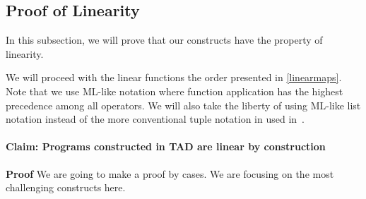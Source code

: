 \subsection{Proof of Linearity}
In this subsection, we will prove that our constructs have the property of linearity.

We will proceed with the linear functions the order presented in
\autoref{linearmaps}.  Note that we use ML-like notation where function application
has the highest precedence among all operators.  We will also take the liberty
of using ML-like list notation instead of the more conventional tuple notation
in used in~\cite{ladr}.

\paragraph{Claim:  Programs constructed in TAD are linear by construction}

\textbf{Proof}
We are going to make a proof by cases.  We are focusing on the most challenging
constructs here.

